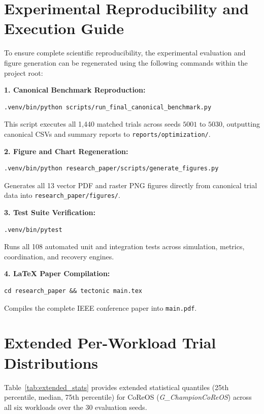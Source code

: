 \documentclass[conference]{IEEEtran}
\begin{document}
\section{Experimental Reproducibility and Execution Guide}
\label{app:reproducibility}
To ensure complete scientific reproducibility, the experimental evaluation and figure generation can be regenerated using the following commands within the project root:

\noindent\textbf{1. Canonical Benchmark Reproduction:}
\begin{verbatim}
.venv/bin/python scripts/run_final_canonical_benchmark.py
\end{verbatim}
This script executes all 1,440 matched trials across seeds $5001$ to $5030$, outputting canonical CSVs and summary reports to \texttt{reports/optimization/}.

\noindent\textbf{2. Figure and Chart Regeneration:}
\begin{verbatim}
.venv/bin/python research_paper/scripts/generate_figures.py
\end{verbatim}
Generates all 13 vector PDF and raster PNG figures directly from canonical trial data into \texttt{research\_paper/figures/}.

\noindent\textbf{3. Test Suite Verification:}
\begin{verbatim}
.venv/bin/pytest
\end{verbatim}
Runs all 108 automated unit and integration tests across simulation, metrics, coordination, and recovery engines.

\noindent\textbf{4. LaTeX Paper Compilation:}
\begin{verbatim}
cd research_paper && tectonic main.tex
\end{verbatim}
Compiles the complete IEEE conference paper into \texttt{main.pdf}.

\section{Extended Per-Workload Trial Distributions}
\label{app:distributions}
Table~\ref{tab:extended_stats} provides extended statistical quantiles (25th percentile, median, 75th percentile) for CoReOS (\textit{G\_ChampionCoReOS}) across all six workloads over the 30 evaluation seeds.
\end{document}
